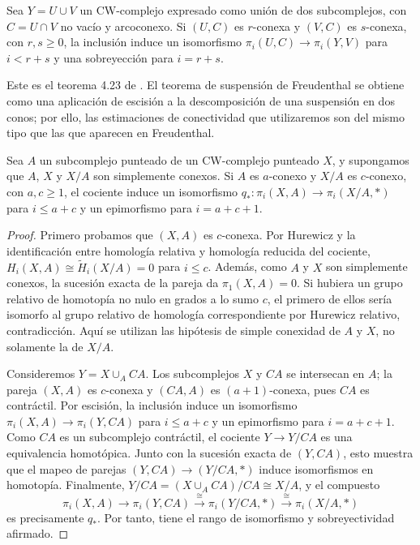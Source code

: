 \begin{teo}
Sea $Y=U\cup V$ un CW-complejo expresado como unión de dos subcomplejos, con $C=U\cap V$ no vacío y arcoconexo. Si $(U,C)$ es $r$-conexa y $(V,C)$ es $s$-conexa, con $r,s\geq0$, la inclusión induce un isomorfismo $\pi_i(U,C)\to\pi_i(Y,V)$ para $i<r+s$ y una sobreyección para $i=r+s$.
\end{teo}

Este es el teorema 4.23 de \cite{hatcher2002}. El teorema de suspensión de Freudenthal se obtiene como una aplicación de escisión a la descomposición de una suspensión en dos conos; por ello, las estimaciones de conectividad que utilizaremos son del mismo tipo que las que aparecen en Freudenthal.

\begin{coro}\label{coro:C2-cociente}
Sea $A$ un subcomplejo punteado de un CW-complejo punteado $X$, y supongamos que $A$, $X$ y $X/A$ son simplemente conexos. Si $A$ es $a$-conexo y $X/A$ es $c$-conexo, con $a,c\geq1$, el cociente induce un isomorfismo $q_*\colon\pi_i(X,A)\to\pi_i(X/A,*)$ para $i\leq a+c$ y un epimorfismo para $i=a+c+1$.
\end{coro}
\begin{proof}
Primero probamos que $(X,A)$ es $c$-conexa. Por Hurewicz y la identificación entre homología relativa y homología reducida del cociente, $H_i(X,A)\cong\widetilde H_i(X/A)=0$ para $i\leq c$. Además, como $A$ y $X$ son simplemente conexos, la sucesión exacta de la pareja da $\pi_1(X,A)=0$. Si hubiera un grupo relativo de homotopía no nulo en grados a lo sumo $c$, el primero de ellos sería isomorfo al grupo relativo de homología correspondiente por Hurewicz relativo, contradicción. Aquí se utilizan las hipótesis de simple conexidad de $A$ y $X$, no solamente la de $X/A$.

Consideremos $Y=X\cup_A CA$. Los subcomplejos $X$ y $CA$ se intersecan en $A$; la pareja $(X,A)$ es $c$-conexa y $(CA,A)$ es $(a+1)$-conexa, pues $CA$ es contráctil. Por escisión, la inclusión induce un isomorfismo $\pi_i(X,A)\to\pi_i(Y,CA)$ para $i\leq a+c$ y un epimorfismo para $i=a+c+1$. Como $CA$ es un subcomplejo contráctil, el cociente $Y\to Y/CA$ es una equivalencia homotópica. Junto con la sucesión exacta de $(Y,CA)$, esto muestra que el mapeo de parejas $(Y,CA)\to(Y/CA,*)$ induce isomorfismos en homotopía. Finalmente, $Y/CA=(X\cup_A CA)/CA\cong X/A$, y el compuesto
\[
\pi_i(X,A)\longrightarrow\pi_i(Y,CA)
\xrightarrow{\ \cong\ }\pi_i(Y/CA,*)
\xrightarrow{\ \cong\ }\pi_i(X/A,*)
\]
es precisamente $q_*$. Por tanto, tiene el rango de isomorfismo y sobreyectividad afirmado.
\end{proof}

